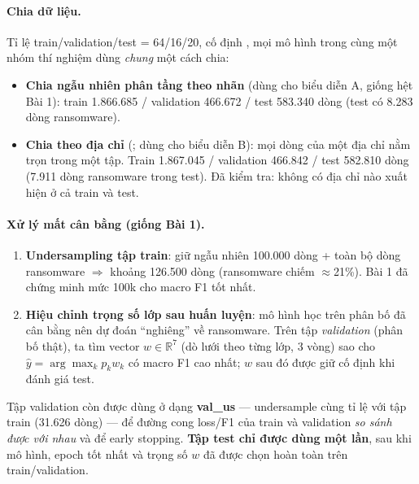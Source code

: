 \paragraph{Chia dữ liệu.} Tỉ lệ train/validation/test = 64/16/20, cố định , mọi mô hình trong cùng một
nhóm thí nghiệm dùng \emph{chung} một cách chia:
\begin{itemize}
\item \textbf{Chia ngẫu nhiên phân tầng theo nhãn} (dùng cho biểu diễn A, giống hệt Bài 1):
  train 1.866.685 / validation 466.672 / test 583.340 dòng (test có 8.283 dòng ransomware).
\item \textbf{Chia theo địa chỉ} (; dùng cho biểu diễn B): mọi dòng của một địa chỉ nằm trọn trong
  một tập. Train 1.867.045 / validation 466.842 / test 582.810 dòng (7.911 dòng ransomware trong test).
  Đã kiểm tra: không có địa chỉ nào xuất hiện ở cả train và test.
\end{itemize}

\paragraph{Xử lý mất cân bằng (giống Bài 1).}
\begin{enumerate}
\item \textbf{Undersampling tập train}: giữ ngẫu nhiên 100.000 dòng  + toàn bộ dòng ransomware
  $\Rightarrow$ khoảng 126.500 dòng (ransomware chiếm $\approx$21\%). Bài 1 đã chứng minh mức 100k cho macro F1 tốt nhất.
\item \textbf{Hiệu chỉnh trọng số lớp sau huấn luyện}: mô hình học trên phân bố đã cân bằng nên dự đoán ``nghiêng'' về ransomware.
  Trên tập \emph{validation} (phân bố thật), ta tìm vector $w\in\mathbb{R}^7$ (dò lưới theo từng lớp, 3 vòng) sao cho
  $\hat y=\arg\max_k p_k w_k$ có macro F1 cao nhất; $w$ sau đó được giữ cố định khi đánh giá test.
\end{enumerate}
Tập validation còn được dùng ở dạng \textbf{val\_us} --- undersample  cùng tỉ lệ với tập train (31.626 dòng) ---
để đường cong loss/F1 của train và validation \emph{so sánh được với nhau} và để early stopping.
\textbf{Tập test chỉ được dùng một lần}, sau khi mô hình, epoch tốt nhất và trọng số $w$ đã được chọn hoàn toàn trên train/validation.
